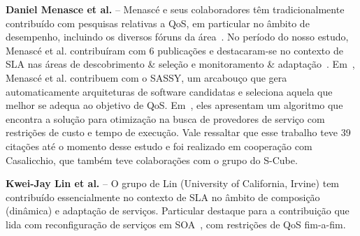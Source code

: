 \textbf{Daniel Menasce et al.} -- Menasc\'{e} e seus colaboradores t\^{e}m tradicionalmente contribu\'{i}do com pesquisas relativas a QoS, em particular no \^{a}mbito de desempenho, incluindo os diversos f\'{o}runs da \'{a}rea~\cite{DBLP:journals/tse/MenasceG00, Menasce:2001:CPW:560806}. No per\'{i}odo do nosso estudo, Menasc\'{e} et al. contribu\'{i}ram com 6 publica\c{c}\~{o}es e destacaram-se no contexto de SLA nas \'{a}reas de descobrimento \& sele\c{c}\~{a}o e monitoramento \& adapta\c{c}\~{a}o~\cite{5696721, DBLP:MenasceCD10, 5552741}. Em~\cite{5696721}, Menasc\'{e} et al. contribuem com o SASSY, um arcabou\c{c}o que gera automaticamente arquiteturas de software candidatas e seleciona aquela que melhor se adequa ao objetivo de QoS. Em~\cite{DBLP:MenasceCD10}, eles apresentam um algoritmo que encontra a solu\c{c}\~{a}o para otimiza\c{c}\~{a}o na busca de provedores de servi\c{c}o com restri\c{c}\~{o}es de custo e tempo de execu\c{c}\~{a}o. Vale ressaltar que esse trabalho teve 39 cita\c{c}\~{o}es at\'{e} o momento desse estudo e foi realizado em coopera\c{c}\~{a}o com Casalicchio, que tamb\'{e}m teve colabora\c{c}\~{o}es com o grupo do S-Cube.  

\textbf{Kwei-Jay Lin et al.} -- O grupo de Lin (University of California, Irvine) tem contribu\'{i}do essencialmente no contexto de SLA no \^{a}mbito de composi\c{c}\~{a}o (din\^{a}mica) e adapta\c{c}\~{a}o de servi\c{c}os. Particular destaque para  a contribui\c{c}\~{a}o \cite{Lin:2009:EAS:1602932.1603224, Lin:2010:DIS:1861294.1861332, Zhai:2009:SMS:1586636.1586972} que lida com reconfigura\c{c}\~{a}o de servi\c{c}os em SOA~\cite{SOA REFERENCE}, com restri\c{c}\~{o}es de QoS fim-a-fim. 



